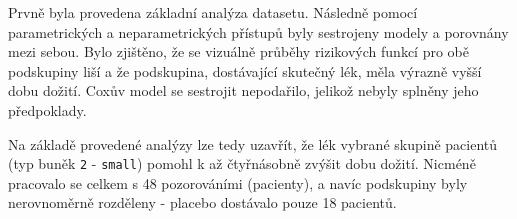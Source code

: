 \documentclass[a4, 11pt]{article}
\theoremstyle{definition}
\theoremstyle{remark}
\begin{document}
    Prvně byla provedena základní analýza datasetu. Následně pomocí parametrických a neparametrických přístupů byly sestrojeny modely a porovnány mezi sebou. Bylo zjištěno, že se vizuálně průběhy rizikových funkcí pro obě podskupiny liší a že podskupina, dostávající skutečný lék, měla výrazně vyšší dobu dožití.
    Coxův model se sestrojit nepodařilo, jelikož nebyly splněny jeho předpoklady.
    
    Na základě provedené analýzy lze tedy uzavřít, že lék vybrané skupině pacientů (typ buněk \texttt{2} - \texttt{small}) pomohl k až čtyřnásobně zvýšit dobu dožití. Nicméně pracovalo se celkem s 48 pozorováními (pacienty), a navíc podskupiny byly nerovnoměrně rozděleny - placebo dostávalo pouze 18 pacientů.
     
    
\end{document}
